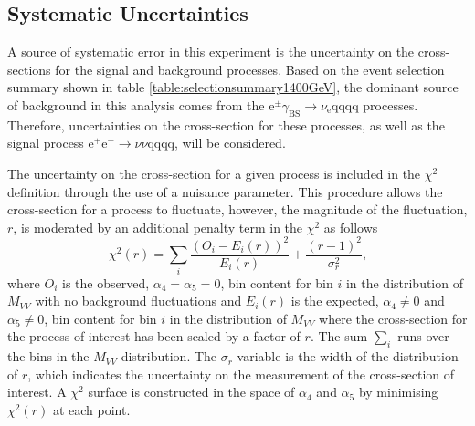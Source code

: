 
\subsection{Systematic Uncertainties}
\label{sec:systematics}
A source of systematic error in this experiment is the uncertainty on the cross-sections for the signal and background processes.  Based on the event selection summary shown in table \ref{table:selectionsummary1400GeV}, the dominant source of background in this analysis comes from the $\text{e}^{\pm}\gamma_{\text{BS}} \rightarrow \nu_{\text{e}}\text{qqqq}$ processes.  Therefore, uncertainties on the cross-section for these processes, as well as the signal process $\text{e}^{+}\text{e}^{-} \rightarrow \nu{\nu}\text{qqqq}$, will be considered.  

The uncertainty on the cross-section for a given process is included in the $\chi^{2}$ definition through the use of a nuisance parameter.  This procedure allows the cross-section for a process to fluctuate, however, the magnitude of the fluctuation, $r$, is moderated by an additional penalty term in the $\chi^{2}$ as follows
%
\begin{equation}
\chi^{2}(r) = \sum_{i} \frac{(O_{i} - E_{i}(r))^{2}}{E_{i}(r)} + \frac{(r-1)^{2}}{\sigma_{r}^{2}} \text{,}
\end{equation}
%
\noindent where $O_{i}$ is the observed, $\alpha_{4} = \alpha_{5} = 0$, bin content for bin $i$ in the distribution of $M_{VV}$ with no background fluctuations and $E_{i}(r)$ is the expected, $\alpha_{4} \neq 0$ and $\alpha_{5} \neq 0$, bin content for bin $i$ in the distribution of $M_{VV}$ where the cross-section for the process of interest has been scaled by a factor of $r$.  The sum $\sum_{i}$ runs over the bins in the $M_{VV}$ distribution.  The $\sigma_{r}$ variable is the width of the distribution of $r$, which indicates the uncertainty on the measurement of the cross-section of interest.  A $\chi^{2}$ surface is constructed in the space of $\alpha_{4}$ and $\alpha_{5}$ by minimising $\chi^{2}(r)$ at each point.  

